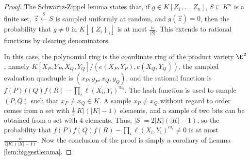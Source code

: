 \documentclass[11pt,letterpaper]{article}
\theoremstyle{definition}
\newcommand{\6}{\mathbf}
\newcommand{\7}{\mathcal}
\newcommand{\lsamp}{\xleftarrow{\$}}
\begin{document}
\begin{proof}

The Schwartz-Zippel lemma 
states that, if $g \in K[Z_1, \ldots, Z_n]$, $S \subseteq K^n$ is a finite set, $\vec{z} \lsamp S$ is sampled uniformly at random, and $g(\vec{z}) = 0$, then the probability that $g \neq 0$ in $K[\left\{Z_i\right\}_i]$ is at most $\frac{n}{\left|S\right|}$. This extends to rational functions by clearing denominators.

In this case, the polynomial ring is the coordinate ring of the product variety $\E^2$, namely $K[X_P,Y_P,X_Q,Y_Q]/(e(X_P,Y_P), e(X_Q,Y_Q))$, the sampled evaluation quadruple is $(x_P,y_P,x_Q,y_Q)$, and the rational function is $f(P)f(Q)f(R) - \prod_i \ell(X_i,Y_i)^{m_i}$. The hash function is used to sample $(P,Q)$ such that $x_P \neq x_Q \in K$. A sample $x_P \neq x_Q$ without regard to order comes from a set with $\frac{1}{2}\left|K\right|\left(\left|K\right|-1\right)$ elements, and a sample of two bits can be obtained from a set with $4$ elements. Thus, $\left|S\right| = 2\left|K\right|\left(\left|K\right|-1\right)$, so the probability that $f(P)f(Q)f(R) - \prod_i \ell(X_i,Y_i)^{m_i} \neq 0$ is at most $\frac{n}{2\left|K\right|\left(\left|K\right|-1\right)}$.
Now the conclusion of the proof is simply a corollary of Lemma \ref{lem:biggestlemma}.
\end{proof}
\end{document}
